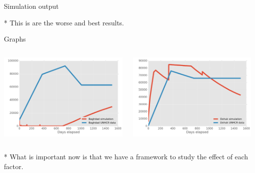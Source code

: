 \documentclass[presentation]{beamer}
\begin{document}
\begin{frame}[label=sec-2]{Simulation output}
\begin{block}{*}
This is are the worse and best results.
\end{block}
\begin{block}{Graphs}
\begin{columns}
\begin{column}{0.4\textwidth}

\includegraphics[width=.9\linewidth]{../../outiraq/Baghdad-4.png}
\end{column}
\begin{column}{0.4\textwidth}

\includegraphics[width=.9\linewidth]{../../outiraq/Dohuk-4.png}
\end{column}
\end{columns}
\end{block}
\begin{block}{*}
What is important now is that we have a framework to study the effect of each
 factor.
\end{block}
\end{frame}
\end{document}
